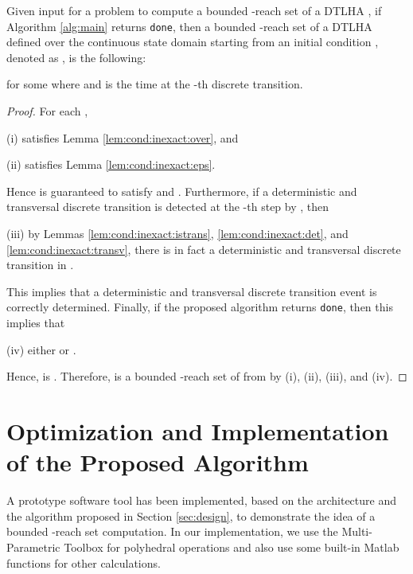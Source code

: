 \begin{thm}
Given input   for a problem to compute a bounded -reach set of a DTLHA , 
if Algorithm \ref{alg:main} returns {\tt done}, then a bounded -reach set of a DTLHA  defined over the continuous state domain  starting from an initial condition , denoted as , is the following:

for some  where  and  is the time at the -th discrete transition. 
\end{thm}
\begin{proof}
For each , 
\begin{inparaenum}
\item[(i)]  satisfies Lemma \ref{lem:cond:inexact:over}, and 
\item[(ii)]  satisfies Lemma \ref{lem:cond:inexact:eps}. 
\end{inparaenum}
Hence  is guaranteed to satisfy 
 and .
Furthermore, if a deterministic and transversal discrete transition is detected at the -th step by , then
\begin{inparaenum}
	\item[(iii)] by Lemmas \ref{lem:cond:inexact:istrans}, \ref{lem:cond:inexact:det}, and \ref{lem:cond:inexact:transv}, there is in fact a deterministic and transversal discrete transition in . 
\end{inparaenum}
This implies that a deterministic and transversal discrete transition event is correctly determined. 
Finally, if the proposed algorithm returns {\tt done}, then this implies that 
\begin{inparaenum}
	\item[(iv)] either  or . 
\end{inparaenum}
Hence,  is .
Therefore,  is a bounded -reach set of  from  by (i), (ii), (iii), and (iv).
\end{proof}




\section{Optimization and Implementation of the Proposed Algorithm}  \label{sec:imp}

A prototype software tool has been implemented, based on the architecture and the algorithm proposed in Section \ref{sec:design}, to demonstrate the idea of a bounded -reach set computation. 
In our implementation, we use the Multi-Parametric Toolbox \cite{mpt} for polyhedral operations and also use some built-in Matlab functions for other calculations. 


